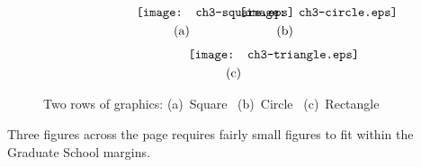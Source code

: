 %
\begin{figure}[h] %
\[
\begin{gathered}
\hbox to 1in{\texttt{[image: ch3-square.eps]}}
\quad
\hbox to 1in{\texttt{[image: ch3-circle.eps]}} \\
\hbox to 1in{\hfill(a)\hfill} \quad \hbox to 1in{\hfill(b)\hfill}
\end{gathered}
\]
%
\vskip 12pt			%
\[
\begin{gathered}
\hbox to 1in{\texttt{[image: ch3-triangle.eps]}}\\
\hbox to 1in{\hfill(c)\hfill}
\end{gathered}
\]

\caption{Two rows of graphics: (a)~Square \ (b)~Circle \ (c)~Rectangle }\label{fig:3.1}
\end{figure}
%

%
%
%

\newpage
Three figures across the page requires fairly small figures to fit within the Graduate School margins.\\

